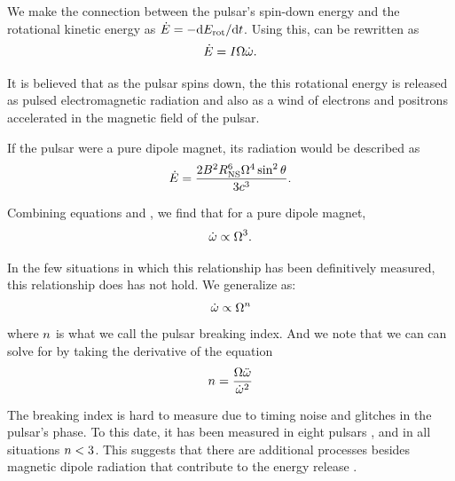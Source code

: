 We make the connection between the pulsar's spin-down
energy and the rotational kinetic energy as $\dot{E}
= - \text{d}E_\text{rot}/\text{d}t$. Using this,
 can be rewritten as
\begin{equation}\eqnlabel{edot_from_rotation}
  \energydot = I \PulsarAngularFrequency \PulsarAngularFrequencyDot.
\end{equation}

It is believed that as the pulsar spins down, the this rotational energy
is released as pulsed electromagnetic radiation and also as a wind of
electrons and positrons accelerated in the magnetic field of the pulsar.

If the pulsar were a pure dipole magnet, its radiation would be described
as \citep{gunn_1969_magnetic-dipole}
\begin{equation}\eqnlabel{edot_pure_dipole}
  \energydot = \frac{2\MagneticField^2 \PulsarRadius^6 
  \PulsarAngularFrequency^4 \sin^2\PulsarRotationAngle}{
  3\speedoflight^3}.
\end{equation}

Combining equations  and
, we find that for a pure dipole magnet,
\begin{equation}\eqnlabel{breaking_index_dipole}
  \PulsarAngularFrequencyDot \propto \PulsarAngularFrequency^3.
\end{equation}

In the few situations in which this relationship has been
definitively measured, this relationship does has not hold.
We generalize  as:
\begin{equation}\eqnlabel{angular_frequency_derivative_relation}
  \PulsarAngularFrequencyDot \propto \PulsarAngularFrequency^\breakingindex
\end{equation}
where $n$ is what we call the pulsar breaking index.
And we note that  we can
can solve for \breakingindex by taking the derivative of the equation
\begin{equation}
  n = \frac{\Omega \ddot{\omega}}{\dot{\omega}^2}
\end{equation}

The breaking index is hard to measure due to timing noise and glitches in
the pulsar's phase. To this date, it has been measured in eight pulsars
\citep[See][ and references therein]{espinoza_2011_braking-index},
and in all situations $n<3$. This suggests that there are
additional processes besides magnetic dipole radiation that contribute
to the energy release \citep{blandford_1988_interpretation-pulsar}.

